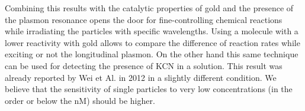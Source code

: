 \documentclass{article}
\begin{document}
Combining this results with the catalytic properties of gold and the presence of
the plasmon resonance opens the door for fine-controlling chemical reactions
while irradiating the particles with specific wavelengths. Using a molecule with
a lower reactivity with gold allows to compare the difference of reaction rates
while exciting or not the longitudinal plasmon. On the other hand this same
technique can be used for detecting the presence of KCN in a solution. This
result was already reported by Wei et Al. in 2012 \cite{Wei2012} in a slightly
different condition. We believe that the sensitivity of single particles to very
low concentrations (in the order or below the nM) should be higher. 

{}

\end{document}
